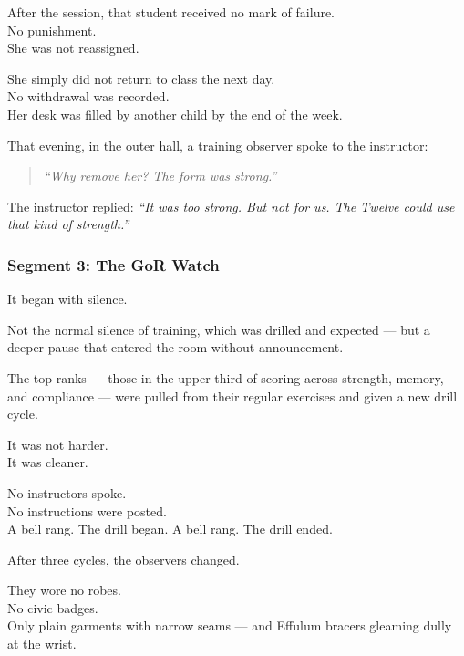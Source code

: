 \documentclass[9pt]{article}
\begin{document}
\vspace{1em}

After the session, that student received no mark of failure.\\
No punishment.\\
She was not reassigned.

She simply did not return to class the next day.\\
No withdrawal was recorded.\\
Her desk was filled by another child by the end of the week.

\vspace{1em}

That evening, in the outer hall, a training observer spoke to the instructor:

\begin{quote}
\textit{“Why remove her? The form was strong.”}
\end{quote}

The instructor replied: \textit{“It was too strong. But not for us. The Twelve could use that kind of strength.”}

\newpage

\subsubsection*{Segment 3: The GoR Watch}

It began with silence.

Not the normal silence of training, which was drilled and expected — but a deeper pause that entered the room without announcement.

The top ranks — those in the upper third of scoring across strength, memory, and compliance — were pulled from their regular exercises and given a new drill cycle.

It was not harder.\\
It was cleaner.

No instructors spoke.\\
No instructions were posted.\\
A bell rang. The drill began. A bell rang. The drill ended.

\vspace{1em}

After three cycles, the observers changed.

They wore no robes.\\
No civic badges.\\
Only plain garments with narrow seams — and Effulum bracers gleaming dully at the wrist.
\end{document}
